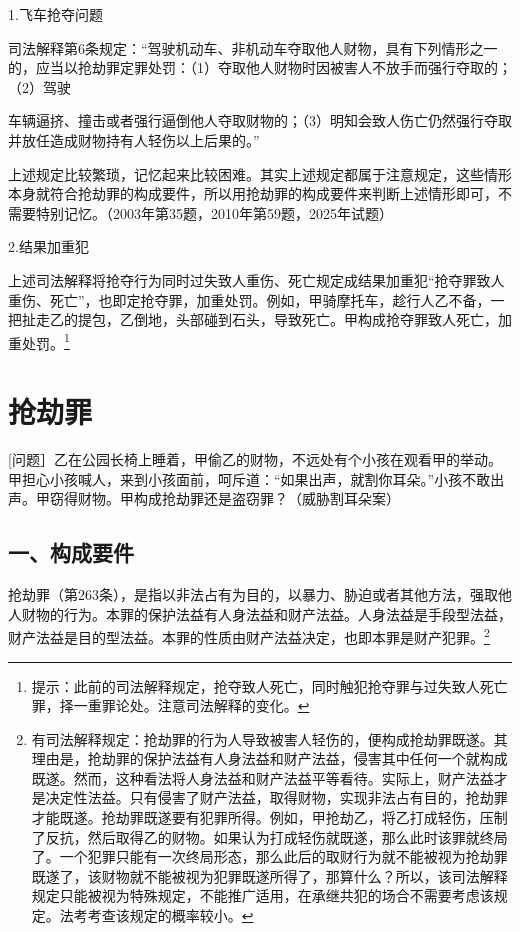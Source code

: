 1.飞车抢夺问题

司法解释第6条规定：“驾驶机动车、非机动车夺取他人财物，具有下列情形之一的，应当以抢劫罪定罪处罚：（1）夺取他人财物时因被害人不放手而强行夺取的；（2）驾驶

车辆逼挤、撞击或者强行逼倒他人夺取财物的；（3）明知会致人伤亡仍然强行夺取并放任造成财物持有人轻伤以上后果的。”

上述规定比较繁琐，记忆起来比较困难。其实上述规定都属于注意规定，这些情形本身就符合抢劫罪的构成要件，所以用抢劫罪的构成要件来判断上述情形即可，不需要特别记忆。（2003年第35题，2010年第59题，2025年试题）

2.结果加重犯

上述司法解释将抢夺行为同时过失致人重伤、死亡规定成结果加重犯“抢夺罪致人重伤、死亡”，也即定抢夺罪，加重处罚。例如，甲骑摩托车，趁行人乙不备，一把扯走乙的提包，乙倒地，头部碰到石头，导致死亡。甲构成抢夺罪致人死亡，加重处罚。\footnote{提示：此前的司法解释规定，抢夺致人死亡，同时触犯抢夺罪与过失致人死亡罪，择一重罪论处。注意司法解释的变化。}

\section{抢劫罪}

[问题］乙在公园长椅上睡着，甲偷乙的财物，不远处有个小孩在观看甲的举动。甲担心小孩喊人，来到小孩面前，呵斥道：“如果出声，就割你耳朵。”小孩不敢出声。甲窃得财物。甲构成抢劫罪还是盗窃罪？（威胁割耳朵案）

\subsection*{一、构成要件}

抢劫罪（第263条），是指以非法占有为目的，以暴力、胁迫或者其他方法，强取他人财物的行为。本罪的保护法益有人身法益和财产法益。人身法益是手段型法益，财产法益是目的型法益。本罪的性质由财产法益决定，也即本罪是财产犯罪。\footnote{有司法解释规定：抢劫罪的行为人导致被害人轻伤的，便构成抢劫罪既遂。其理由是，抢劫罪的保护法益有人身法益和财产法益，侵害其中任何一个就构成既遂。然而，这种看法将人身法益和财产法益平等看待。实际上，财产法益才是决定性法益。只有侵害了财产法益，取得财物，实现非法占有目的，抢劫罪才能既遂。抢劫罪既遂要有犯罪所得。例如，甲抢劫乙，将乙打成轻伤，压制了反抗，然后取得乙的财物。如果认为打成轻伤就既遂，那么此时该罪就终局了。一个犯罪只能有一次终局形态，那么此后的取财行为就不能被视为抢劫罪既遂了，该财物就不能被视为犯罪既遂所得了，那算什么？所以，该司法解释规定只能被视为特殊规定，不能推广适用，在承继共犯的场合不需要考虑该规定。法考考查该规定的概率较小。}

